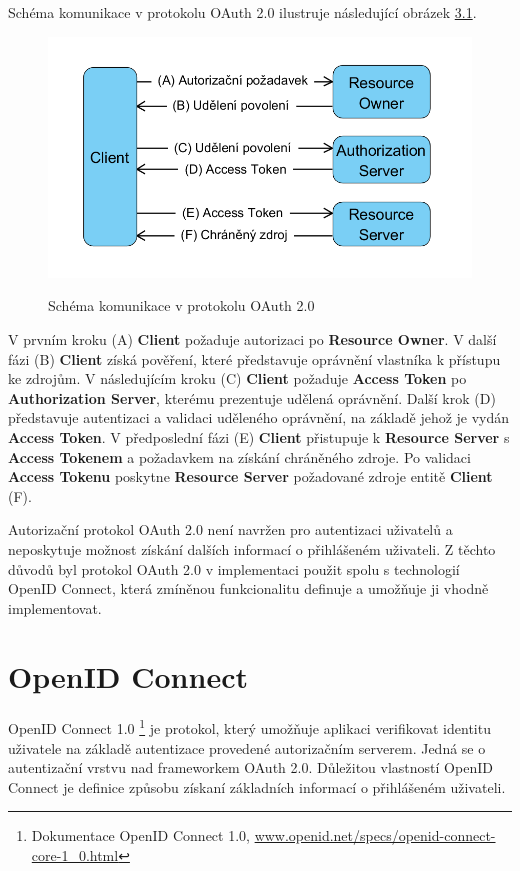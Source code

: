 \documentclass[
  printed, %
  twoside, %
  table,   %
  nolof,     %
  nolot,     %
]{fithesis3}
\begin{document}
Schéma komunikace v protokolu OAuth 2.0 ilustruje následující obrázek \hyperref[fig:oauth]{3.1}. 

\begin{figure}[H]
\caption{Schéma komunikace v protokolu OAuth 2.0}
\centering
\includegraphics[width=12.8cm]{pics/diplomkaOauth} 
\label{fig:oauth}
\end{figure}
\par 

V prvním kroku (A) \textbf{Client} požaduje autorizaci po \textbf{Resource Owner}. V další fázi (B) \textbf{Client} získá pověření, které představuje oprávnění vlastníka k přístupu ke zdrojům. V následujícím kroku (C) \textbf{Client} požaduje \textbf{Access Token} po \textbf{Authorization Server}, kterému prezentuje udělená oprávnění. Další krok (D) představuje autentizaci a validaci uděleného oprávnění, na základě jehož je vydán \textbf{Access Token}. V předposlední fázi (E) \textbf{Client} přistupuje k \textbf{Resource Server} s \textbf{Access Tokenem} a požadavkem na získání chráněného zdroje. Po validaci \textbf{Access Tokenu} poskytne \textbf{Resource Server} požadované zdroje entitě \textbf{Client} (F). \par 

Autorizační protokol OAuth 2.0 není navržen pro autentizaci uživatelů a neposkytuje možnost získání dalších informací o přihlášeném uživateli. Z těchto důvodů byl protokol OAuth 2.0 v implementaci použit spolu s technologií OpenID Connect, která zmíněnou funkcionalitu definuje a umožňuje ji vhodně implementovat. 

\section{OpenID Connect}
\label{sec:oidc}
OpenID Connect 1.0 \footnote{Dokumentace OpenID Connect 1.0, \url{www.openid.net/specs/openid-connect-core-1_0.html}} je protokol, který umožňuje aplikaci verifikovat identitu uživatele na základě autentizace provedené autorizačním serverem. Jedná se o autentizační vrstvu nad frameworkem OAuth 2.0. Důležitou vlastností OpenID Connect je definice způsobu získaní základních informací o přihlášeném uživateli. \par
\end{document}
